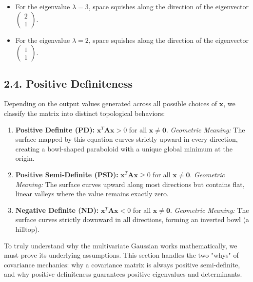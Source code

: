 \documentclass{article}
\begin{document}
\begin{itemize}
    \item For the eigenvalue \textbf{$\lambda = 3$}, space squishes along the direction of the eigenvector \textbf{$\begin{pmatrix} 2 \\ 1 \end{pmatrix}$}.
    \item For the eigenvalue \textbf{$\lambda = 2$}, space squishes along the direction of the eigenvector \textbf{$\begin{pmatrix} 1 \\ 1 \end{pmatrix}$}.
\end{itemize}

\subsection*{2.4. Positive Definiteness}

Depending on the output values generated across all possible choices of $\mathbf{x}$, we classify the matrix into distinct topological behaviors:

\begin{enumerate}
    \item \textbf{Positive Definite (PD):} $\mathbf{x}^T \mathbf{A} \mathbf{x} > 0$ for all $\mathbf{x} \neq \mathbf{0}$. 
    \textit{Geometric Meaning:} The surface mapped by this equation curves strictly upward in every direction, creating a bowl-shaped paraboloid with a unique global minimum at the origin.
    
    \item \textbf{Positive Semi-Definite (PSD):} $\mathbf{x}^T \mathbf{A} \mathbf{x} \ge 0$ for all $\mathbf{x} \neq \mathbf{0}$.
    \textit{Geometric Meaning:} The surface curves upward along most directions but contains flat, linear valleys where the value remains exactly zero.
    
    \item \textbf{Negative Definite (ND):} $\mathbf{x}^T \mathbf{A} \mathbf{x} < 0$ for all $\mathbf{x} \neq \mathbf{0}$.
    \textit{Geometric Meaning:} The surface curves strictly downward in all directions, forming an inverted bowl (a hilltop).
\end{enumerate}

To truly understand why the multivariate Gaussian works mathematically, we must prove its underlying assumptions. This section handles the two "whys" of covariance mechanics: why a covariance matrix is always positive semi-definite, and why positive definiteness guarantees positive eigenvalues and determinants.
\end{document}

